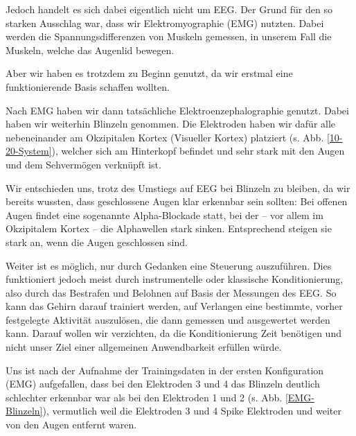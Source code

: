 \documentclass[11pt]{scrartcl}
\begin{document}
	Jedoch handelt es sich dabei eigentlich nicht um EEG. Der Grund für den so starken Ausschlag war, dass wir Elektromyographie (EMG) nutzten. Dabei werden die Spannungsdifferenzen von Muskeln gemessen, in unserem Fall die Muskeln, welche das Augenlid bewegen. \cite{wiki:EMG}

	Aber wir haben es trotzdem zu Beginn genutzt, da wir erstmal eine funktionierende Basis schaffen wollten.

	Nach EMG haben wir dann tatsächliche Elektroenzephalographie genutzt. Dabei haben wir weiterhin Blinzeln genommen. Die Elektroden haben wir dafür alle nebeneinander am Okzipitalen Kortex (Visueller Kortex) platziert (s. Abb. \ref{10-20-System}), welcher sich am Hinterkopf befindet und sehr stark mit den Augen und dem Sehvermögen verknüpft ist. \cite{Birbaumer2010} 

	Wir entschieden uns, trotz des Umstiegs auf EEG bei Blinzeln zu bleiben, da wir bereits wussten, dass geschlossene Augen klar erkennbar sein sollten: Bei offenen Augen findet eine sogenannte Alpha-Blockade statt, bei der -- vor allem im Okzipitalem Kortex -- die Alphawellen stark sinken. Entsprechend steigen sie stark an, wenn die Augen geschlossen sind. \cite{Springer:Berger} \cite{Praktikum} \cite{wiki:Berger-Effekt}

	Weiter ist es möglich, nur durch Gedanken eine Steuerung auszuführen. Dies funktioniert jedoch meist durch instrumentelle oder klassische Konditionierung, also durch das Bestrafen und Belohnen auf Basis der Messungen des EEG. So kann das Gehirn darauf trainiert werden, auf Verlangen eine bestimmte, vorher festgelegte Aktivität auszulösen, die dann gemessen und ausgewertet werden kann. \cite{BCIChaudhary} Darauf wollen wir verzichten, da die Konditionierung Zeit benötigen und nicht unser Ziel einer allgemeinen Anwendbarkeit erfüllen würde.


	Uns ist nach der Aufnahme der Trainingsdaten in der ersten Konfiguration (EMG) aufgefallen, dass bei den Elektroden 3 und 4 das Blinzeln deutlich schlechter erkennbar war als bei den Elektroden 1 und 2 (s. Abb. \ref{EMG-Blinzeln}), vermutlich weil die Elektroden 3 und 4 Spike Elektroden und weiter von den Augen entfernt waren.
\end{document}
